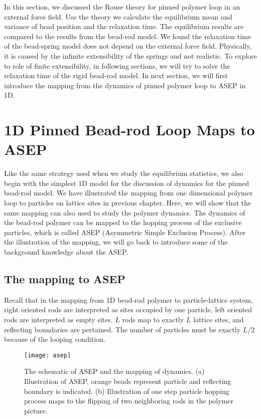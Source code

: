 In this section, we discussed the Rouse theory for pinned polymer loop in an external force field. Use the theory we calculate the equilibrium mean and variance of bead position and the relaxation time. The equilibrium results are compared to the results from the bead-rod model. We found the relaxation time of the bead-spring model does not depend on the external force field. Physically, it is caused by the infinite extensibility of the springs and not realistic. To explore to role of finite extensibility, in following sections, we will try to solve the relaxation time of the rigid bead-rod model. In next section, we will first introduce the mapping from the dynamics of pinned polymer loop to ASEP in 1D. 


\section{1D Pinned Bead-rod Loop Maps to ASEP}
\label{sec:1d_pinned_bead_rod_loop_maps_to_asep}
Like the same strategy used when we study the equilibrium statistics, we also begin with the simplest 1D model for the discussion of dynamics for the pinned bead-rod model. We have illustrated the mapping from one dimensional polymer loop to particles on lattice sites in previous chapter. Here, we will show that the same mapping can also used to study the polymer dynamics. The dynamics of the bead-rod polymer can be mapped to the hopping process of the exclusive particles, which is called ASEP (Asymmetric Simple Exclusion Process). After the illustration of the mapping, we will go back to introduce some of the background knowledge about the ASEP.

\subsection{The mapping to ASEP}
\label{sub:the_mapping_to_asep}
Recall that in the mapping from 1D bead-rod polymer to particle-lattice system, right oriented rods are interpreted as sites occupied by one particle, left oriented rods are interpreted as empty sites. $L$ rods map to exactly $L$ lattice sites, and reflecting boundaries are pertained. The number of particles must be exactly $L/2$ because of the looping condition. 

\begin{figure}[htpb]
    \centering
    \texttt{[image: asep]}
    \caption{The schematic of ASEP and the mapping of dynamics. (a) Illustration of ASEP, orange beads represent particle and reflecting boundary is indicated. (b) Illustration of one step particle hopping process maps to the flipping of two neighboring rods in the polymer picture. }
    \label{fig:asep}
\end{figure}

